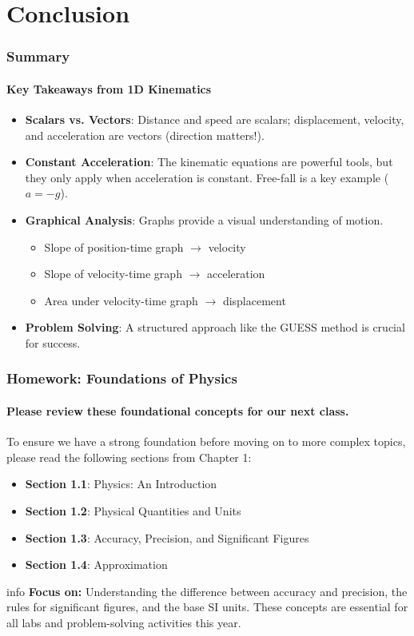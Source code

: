 \documentclass{beamer}
\begin{document}
\section{Conclusion}

\begin{frame}
\frametitle{Summary}
\framesubtitle{Key Takeaways from 1D Kinematics}
\begin{itemize}
    \item \textbf{Scalars vs. Vectors}: Distance and speed are scalars; displacement, velocity, and acceleration are vectors (direction matters!).
    \item \textbf{Constant Acceleration}: The kinematic equations are powerful tools, but they only apply when acceleration is constant. Free-fall is a key example ($a = -g$).
    \item \textbf{Graphical Analysis}: Graphs provide a visual understanding of motion.
    \begin{itemize}
        \item Slope of position-time graph $\rightarrow$ velocity
        \item Slope of velocity-time graph $\rightarrow$ acceleration
        \item Area under velocity-time graph $\rightarrow$ displacement
    \end{itemize}
    \item \textbf{Problem Solving}: A structured approach like the GUESS method is crucial for success.
\end{itemize}
\end{frame}

\begin{frame}
\frametitle{Homework: Foundations of Physics}
\framesubtitle{Please review these foundational concepts for our next class.}

To ensure we have a strong foundation before moving on to more complex topics, please read the following sections from Chapter 1:

\begin{itemize}
    \item \textbf{Section 1.1}: Physics: An Introduction
    \item \textbf{Section 1.2}: Physical Quantities and Units
    \item \textbf{Section 1.3}: Accuracy, Precision, and Significant Figures
    \item \textbf{Section 1.4}: Approximation
\end{itemize}

\vspace{1em}

\begin{beamercolorbox}[rounded=true,shadow=true]{info}
\centering
\textbf{Focus on:} Understanding the difference between accuracy and precision, the rules for significant figures, and the base SI units. These concepts are essential for all labs and problem-solving activities this year.
\end{beamercolorbox}

\end{frame}
\end{document}
